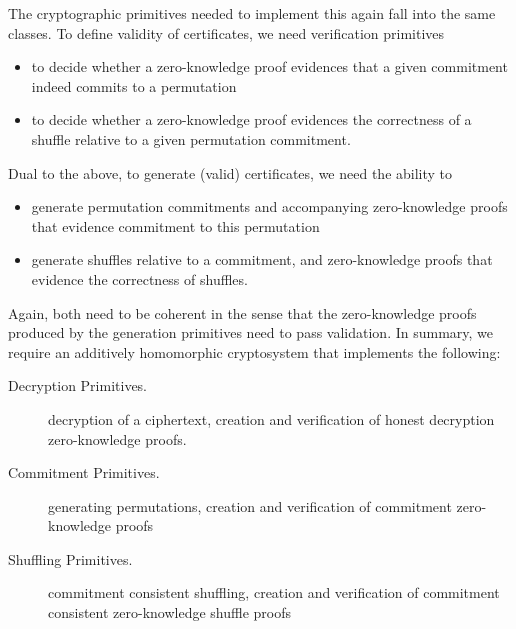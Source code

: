 \noindent
The cryptographic primitives needed to implement this again fall
into the same classes. To define validity of certificates, we need
verification primitives
\begin{itemize}
  \item to decide whether a zero-knowledge proof evidences that a
  given commitment indeed commits to a permutation 
  \item to decide whether a zero-knowledge proof evidences the
  correctness of a shuffle relative to a given permutation
  commitment.
\end{itemize}

\noindent
Dual to the above, to generate (valid) certificates, we need the
ability to
\begin{itemize}
  \item generate permutation commitments and accompanying zero-knowledge proofs that evidence commitment to this permutation
  \item generate shuffles relative to a commitment, and zero-knowledge proofs that evidence the correctness of shuffles.
\end{itemize}

\noindent
Again, both need to be coherent in the sense that the zero-knowledge
proofs produced by the generation primitives need to pass
validation. In summary, we require an additively homomorphic
cryptosystem that implements the following:

\begin{description}
\item[Decryption Primitives.]
  decryption of a ciphertext, creation and verification of
 honest decryption zero-knowledge proofs. 

\item[Commitment Primitives.]
  generating permutations, creation and verification of commitment
  zero-knowledge proofs
\item[Shuffling Primitives.]
  commitment consistent shuffling, creation and verification of
  commitment consistent zero-knowledge shuffle proofs 
\end{description}

